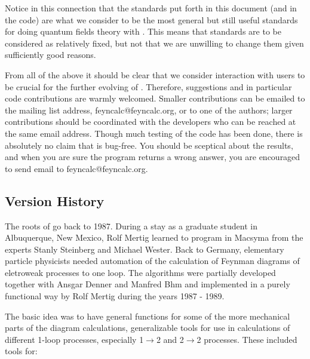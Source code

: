 Notice in this connection that the standards put forth
in this document (and in the code) are what we consider to be the most general but
still useful standards
for doing quantum fields theory with \mma. This means that standards are
to be considered as relatively fixed, but not that we are unwilling to change them
given sufficiently good reasons.

From all of the above it should be clear that we consider interaction with users to be crucial
for the further evolving of \fc. Therefore, suggestions and in particular
code contributions are warmly welcomed. Smaller contributions can be emailed to
the mailing list address, feyncalc@feyncalc.org, or to one of the authors; 
larger contributions should be coordinated with the
developers who can be reached at the same email address.
Though much testing of the code has been done, there is absolutely no claim that
\fc is bug-free. You should be sceptical about the results, and when you are sure the
program  returns a wrong answer, you are encouraged to send email
to feyncalc@feyncalc.org.

\subsection{Version History}

The roots of \fc go back to 1987. 
During a stay as a graduate student in Albuquerque, New Mexico, Rolf Mertig learned to program in Macsyma \cite{Drinkard:1981dr} from the experts Stanly Steinberg and Michael Wester. Back to Germany, 
elementary particle physicists needed automation of the calculation of Feynman diagrams of eletroweak 
processes to one loop. The algorithms were partially developed together with 
Ansgar Denner and Manfred B\ODoubleDot{}hm and implemented in a 
purely functional way by Rolf Mertig during the years 1987 - 1989. 

The basic idea was to have general functions for some of the more mechanical parts of the diagram calculations, generalizable tools for use in calculations of different 1-loop processes, especially 1\(\rightarrow \)2 and 2\(\rightarrow \)2 processes. These included tools for:

